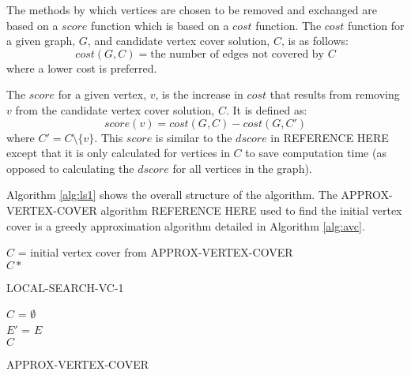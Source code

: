 \documentclass[sigconf]{acmart}
\begin{document}
The methods by which vertices are chosen to be removed and exchanged are based on a $score$ function which is based on a $cost$ function. The $cost$ function for a given graph, $G$, and candidate vertex cover solution, $C$, is as follows:
\begin{equation*}
	cost(G,C) = \text{the number of edges not covered by $C$}
\end{equation*}
where a lower cost is preferred.

The $score$ for a given vertex, $v$, is the increase in $cost$ that results from removing $v$ from the candidate vertex cover solution, $C$. It is defined as:
\begin{equation*}
	score(v) = cost(G,C) - cost(G,C')
\end{equation*}
where $C' = C \setminus \{v\}$. This $score$ is similar to the $dscore$ in REFERENCE HERE except that it is only calculated for vertices in $C$ to save computation time (as opposed to calculating the $dscore$ for all vertices in the graph).

Algorithm \ref{alg:ls1} shows the overall structure of the algorithm. The APPROX-VERTEX-COVER algorithm REFERENCE HERE used to find the initial vertex cover is a greedy approximation algorithm detailed in Algorithm \ref{alg:avc}.

\begin{algorithm}[h]
	\SetAlgoNoLine
	$C$ = initial vertex cover from APPROX-VERTEX-COVER\\
	\Return $C*$
	\caption{LOCAL-SEARCH-VC-1}
	\label{alg:ls1}
\end{algorithm}

\begin{algorithm}[h]
	\SetAlgoNoLine
	$C$ = $\emptyset$\\
	$E'$ = $E$\\
	\Return $C$
	
	\caption{APPROX-VERTEX-COVER}
	\label{alg:avc}
\end{algorithm}
\end{document}
